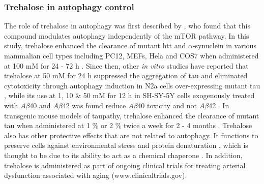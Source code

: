 \subsubsection{Trehalose in autophagy control}
The role of trehalose in autophagy was first described by \citet{Sarkar2007,Sarkar2007a}, who found that this compound modulates autophagy independently of the mTOR pathway. In this study, trehalose enhanced the clearance of mutant htt and $\alpha$-synuclein in various mammalian cell types including PC12, MEFs, Hela and COS7 when administered at 100 mM for 24 - 72 h \citet{Sarkar2007,Sarkar2007a}. Since then, other \textit{in vitro} studies have reported that trehalose at 50 mM for 24 h suppressed the aggregation of tau and eliminated cytotoxicity through autophagy induction in N2a cells over-expressing mutant tau \citep{Kruger2012}, while its use at 1, 10 \& 50 mM for 12 h in SH-SY-5Y cells exogenously treated with $A\beta$40 and $A\beta$42 was found reduce $A\beta$40 toxicity and not $A\beta$42 \citep{Liu2005}. In transgenic mouse models of taupathy, trehalose enhanced  the clearance of mutant tau when administered at 1 \% or 2 \% twice a week for 2 - 4 months \citep{Rodriguez-Navarro2010,Schaeffer2012}. Trehalose also has other protective effects that are not related to autophagy. It functions to preserve cells against environmental stress and protein denaturation \citep{Chen2004,Gonzalez-Polo2015}, which is thought to be due to its ability to act as a chemical chaperone \citep{Sarkar2007}. In addition, trehalose is administered as part of ongoing clinical trials for treating arterial dysfunction associated with aging (www.clinicaltrials.gov).

